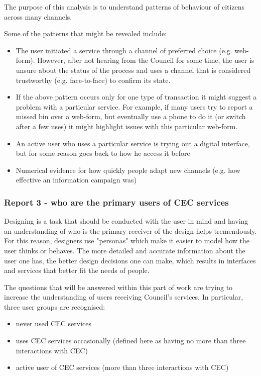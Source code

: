 The purpose of this analysis is to understand patterns of behaviour of citizens across many channels.

Some of the patterns that might be revealed include:
\begin{itemize}
\item The user initiated a service through a channel of preferred choice (e.g. web-form). However, after not hearing from the Council for some time, the user is unsure about the status of the process and uses a channel that is considered trustworthy (e.g. face-to-face) to confirm its state.
\item If the above pattern occurs only for one type of transaction it might suggest a problem with a particular service. For example, if many users try to report a missed bin over a web-form, but eventually use a phone to do it (or switch after a few uses) it might highlight issues with this particular web-form.
\item An active user who uses a particular service is trying out a digital interface, but for some reason goes back to how he access it before
\item Numerical evidence for how quickly people adapt new channels (e.g. how effective an information campaign was)
\end{itemize}	
			
			\subsubsection{Report 3 - who are the primary users of CEC services}
			
Designing is a task that should be conducted with the user in mind and having an understanding of who is the primary receiver of the design helps tremendously. For this reason, designers use "personas" which make it easier to model how the user thinks or behaves. The more detailed and accurate information about the user one has, the  better design decisions one can make, which results in interfaces and services that better fit the needs of people.

The questions that will be answered within this part of work are trying to increase the understanding of users receiving Council's services. In particular, three user groups are recognised:
\begin{itemize}
\item never used CEC services
\item uses CEC services occasionally (defined here as having no more than three interactions with CEC)
\item active user of CEC services (more than three interactions with CEC)
\end{itemize}

